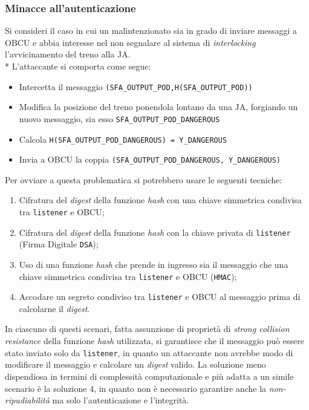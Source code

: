 \subsubsection{Minacce all'autenticazione}
Si consideri il caso in cui un malintenzionato sia in grado di inviare messaggi a OBCU e abbia interesse nel non segnalare al sistema di \emph{interlocking} l'avvicinamento del treno alla JA.\\*
L'attaccante si comporta come segue:
\begin{itemize}
	\item Intercetta il messaggio \texttt{(SFA\_OUTPUT\_POD,H(SFA\_OUTPUT\_POD))}
	\item Modifica la posizione del treno ponendola lontano da una JA, forgiando un nuovo messaggio, sia esso \texttt{SFA\_OUTPUT\_POD\_DANGEROUS}
	\item Calcola \texttt{H(SFA\_OUTPUT\_POD\_DANGEROUS) = Y\_DANGEROUS}
	\item Invia a OBCU la coppia \texttt{(SFA\_OUTPUT\_POD\_DANGEROUS, Y\_DANGEROUS)}
\end{itemize}
Per ovviare a questa problematica si potrebbero usare le seguenti tecniche:
\begin{enumerate}
	\item Cifratura del \emph{digest} della funzione \emph{hash} con una chiave simmetrica condivisa tra \texttt{listener} e OBCU;
	\item Cifratura del \emph{digest} della funzione \emph{hash} con la chiave privata di \texttt{listener} (Firma Digitale \texttt{DSA});
	\item Uso di una funzione \emph{hash} che prende in ingresso sia il messaggio che una chiave simmetrica condivisa tra \texttt{listener} e OBCU (\texttt{HMAC});
	\item Accodare un segreto condiviso tra \texttt{listener} e OBCU al messaggio prima di calcolarne il \emph{digest}.
\end{enumerate}
In ciascuno di questi scenari, fatta assunzione di propriet\`a di \emph{strong collision resistance} della funzione \emph{hash} utilizzata, si garantisce che il messaggio pu\`o essere stato inviato solo da \texttt{listener}, in quanto un attaccante non avrebbe modo di modificare il messaggio e calcolare un \emph{digest} valido. La soluzione meno dispendiosa in termini di complessit\`a computazionale e pi\`u adatta a un simile scenario \`e la soluzione 4, in quanto non \`e necessario garantire anche la \emph{non-ripudiabilit\`a} ma solo l'autenticazione e l'integrit\`a.
